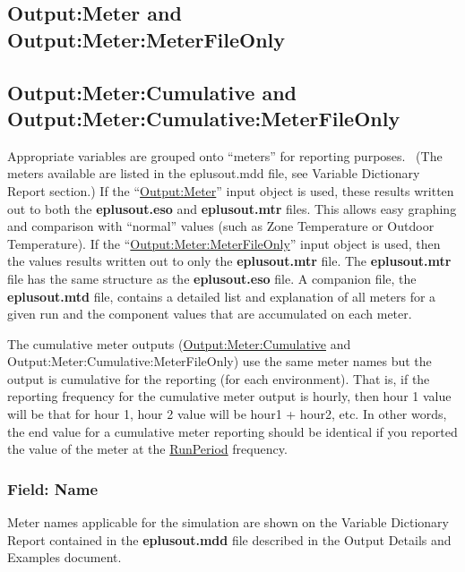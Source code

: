 \subsection{Output:\-Meter and Output:\-Meter:\-Meter\-File\-Only}\label{outputmeter-and-outputmetermeterfileonly}

\subsection{Output:\-Meter:\-Cumulative and Output:\-Meter:\-Cumulative:\-Meter\-File\-Only}\label{outputmetercumulative-and-outputmetercumulativemeterfileonly}

Appropriate variables are grouped onto ``meters'' for reporting purposes.~ (The meters available are listed in the eplusout.mdd file, see Variable Dictionary Report section.) If the ``\hyperref[outputmeter-and-outputmetermeterfileonly]{Output:Meter}'' input object is used, these results written out to both the \textbf{eplusout.eso} and \textbf{eplusout.mtr} files. This allows easy graphing and comparison with ``normal'' values (such as Zone Temperature or Outdoor Temperature). If the ``\hyperref[outputmeter-and-outputmetermeterfileonly]{Output:Meter:MeterFileOnly}'' input object is used, then the values results written out to only the \textbf{eplusout.mtr} file. The \textbf{eplusout.mtr} file has the same structure as the \textbf{eplusout.eso} file. A companion file, the \textbf{eplusout.mtd} file, contains a detailed list and explanation of all meters for a given run and the component values that are accumulated on each meter.

The cumulative meter outputs (\hyperref[outputmetercumulative-and-outputmetercumulativemeterfileonly]{Output:Meter:Cumulative} and Output:\-Meter:\-Cumulative:\-Meter\-File\-Only) use the same meter names but the output is cumulative for the reporting (for each environment). That is, if the reporting frequency for the cumulative meter output is hourly, then hour 1 value will be that for hour 1, hour 2 value will be hour1 + hour2, etc. In other words, the end value for a cumulative meter reporting should be identical if you reported the value of the meter at the \hyperref[runperiod]{RunPeriod} frequency.

\subsubsection{Field: Name}\label{field-name-1-036}

Meter names applicable for the simulation are shown on the Variable Dictionary Report contained in the \textbf{eplusout.mdd} file described in the Output Details and Examples document.

